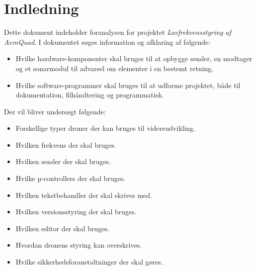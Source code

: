 \documentclass[Main]{subfiles}
\begin{document}
\chapter{Indledning}
Dette dokument indeholder foranalysen for projektet \textit{Lavfrekvensstyring af AeroQuad}.
I dokumentet søges information og afklaring af følgende:
\begin{itemize}
\item Hvilke hardware-komponenter skal bruges til at opbygge sender, en modtager og et sonarmodul til advarsel om elementer i en bestemt retning.
\item Hvilke software-programmer skal bruges til at udforme projektet, både til dokumentation, filhåndtering og programmatisk.
\end{itemize}

Der vil bliver undersøgt følgende:
\begin{itemize}
\item Forskellige typer droner der kan bruges til videreudvikling.
\item Hvilken frekvens der skal bruges.
\item Hvilken sender der skal bruges.
\item Hvilke µ-controllers der skal bruges.
\item Hvilken tekstbehandler der skal skrives med.
\item Hvilken versionsstyring der skal bruges.
\item Hvilken editor der skal bruges.
\item Hvordan dronens styring kan overskrives.
\item Hvilke sikkerhedsforanstaltninger der skal gøres.
\end{itemize}
\end{document}
